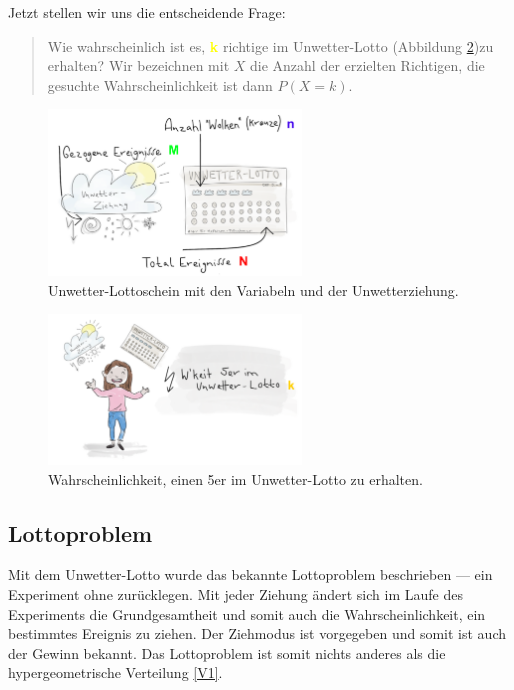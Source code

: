 \begin{refsection}
Jetzt stellen wir uns die entscheidende Frage: 
\begin{quote}
Wie wahrscheinlich ist es, \textcolor{yellow}{\textbf{k}} richtige im Unwetter-Lotto (Abbildung \ref{WahrscheinlichkeitUnwetter-Lotto})zu erhalten? Wir bezeichnen mit $X$ die Anzahl der erzielten Richtigen, die gesuchte Wahrscheinlichkeit ist dann $P(X=k)$.
\end{quote}

\begin{figure}
\centering
\includegraphics[width=0.6\textwidth]{extrem/Lottoscheinausgefuellt.pdf}
\caption{Unwetter-Lottoschein mit den Variabeln und der Unwetterziehung.}
\label{ErklaerungLotto}
\end{figure}

\begin{figure}
\centering
\includegraphics[width=0.6\textwidth]{extrem/wkeitlotto.pdf}
\caption{Wahrscheinlichkeit, einen 5er im Unwetter-Lotto zu erhalten.}
\label{WahrscheinlichkeitUnwetter-Lotto}
\end{figure}


\subsection{Lottoproblem} \label{Lottoproblem}
Mit dem Unwetter-Lotto wurde das bekannte Lottoproblem beschrieben --- ein Experiment ohne zurücklegen. Mit jeder Ziehung ändert sich im Laufe des Experiments die Grundgesamtheit und somit auch die Wahrscheinlichkeit, ein bestimmtes Ereignis zu ziehen. Der Ziehmodus ist vorgegeben und somit ist auch der Gewinn bekannt. Das Lottoproblem ist somit nichts anderes als die hypergeometrische Verteilung \eqref{V1}.


\end{refsection}
